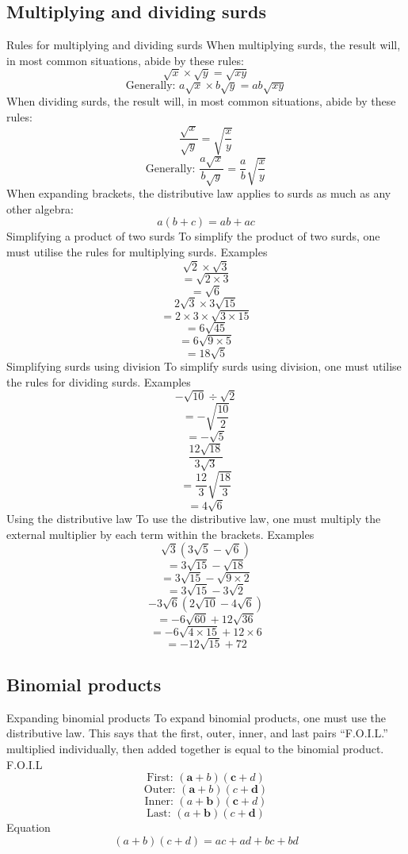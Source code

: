 \begin{outline}
\subsection{Multiplying and dividing surds}
	\1 Rules for multiplying and dividing surds
	 	\2 When multiplying surds, the result will, in most common situations, abide by these rules:
	 	 	\[\sqrt{x} \times \sqrt{y} = \sqrt{xy}\]
	 	 	\[\text{Generally: } a\sqrt{x} \times b\sqrt{y} = ab\sqrt{xy}\]
	 	\2 When dividing surds, the result will, in most common situations, abide by these rules:
	 	 	\[\frac{\sqrt{x}}{\sqrt{y}} = \sqrt{\frac{x}{y}}\]
	 	 	\[\text{Generally: } \frac{a\sqrt{x}}{b\sqrt{y}} = \frac{a}{b}\sqrt{\frac{x}{y}}\]
	 	\2 When expanding brackets, the distributive law applies to surds as much as any other algebra:
	 	 	\[a(b+c) = ab+ac\]
	\1 Simplifying a product of two surds
	 	\2 To simplify the product of two surds, one must utilise the rules for multiplying surds.
	 	 	\3 Examples
	 	 	 	\[\sqrt{2} \times \sqrt{3}\]
	 	 	 	\[= \sqrt{2 \times 3}\]
	 	 	 	\[= \sqrt{6}\]
	 	 	 	\[\]
	 	 	 	\[2\sqrt{3} \times 3\sqrt{15}\]
	 	 	 	\[= 2 \times 3 \times \sqrt{3 \times 15}\]
	 	 	 	\[= 6\sqrt{45}\]
	 	 	 	\[= 6\sqrt{9 \times 5}\]
	 	 	 	\[= 18\sqrt{5}\]
	\1 Simplifying surds using division
	 	\2 To simplify surds using division, one must utilise the rules for dividing surds.
	 	 	\3 Examples
	 	 	 	\[-\sqrt{10} \div \sqrt{2}\]
	 	 	 	\[= -\sqrt{\frac{10}{2}}\]
	 	 	 	\[= -\sqrt{5}\]
	 	 	 	\[\]
	 	 	 	\[\frac{12\sqrt{18}}{3\sqrt{3}}\]
	 	 	 	\[= \frac{12}{3}\sqrt{\frac{18}{3}}\]
	 	 	 	\[= 4\sqrt{6}\]
	\1 Using the distributive law
	 	\2 To use the distributive law, one must multiply the external multiplier by each term within the brackets.
	 		\3 Examples
	 			\[\sqrt{3}(3\sqrt{5}-\sqrt{6})\]
	 			\[= 3\sqrt{15}-\sqrt{18}\]
	 			\[= 3\sqrt{15}-\sqrt{9 \times 2}\]
	 			\[= 3\sqrt{15}-3\sqrt{2}\]
	 			\[\]
	 			\[-3\sqrt{6}(2\sqrt{10}-4\sqrt{6})\]
	 			\[= -6\sqrt{60}+12\sqrt{36}\]
	 			\[= -6\sqrt{4 \times 15}+12 \times 6\]
	 			\[= -12\sqrt{15}+72\]

\0
\subsection{Binomial products}
	\1 Expanding binomial products
		\2 To expand binomial products, one must use the distributive law. This says that the first, outer, inner, and last pairs ``F.O.I.L.'' multiplied individually, then added together is equal to the binomial product.
			\3 F.O.I.L
				\[\text{First: }(\textbf{a} + b)(\textbf{c} + d)\]
				\[\text{Outer: }(\textbf{a} + b)(c + \textbf{d})\]
				\[\text{Inner: }(a + \textbf{b})(\textbf{c} + d)\]
				\[\text{Last: }(a + \textbf{b})(c + \textbf{d})\]
			\3 Equation
				\[(a + b)(c + d) = ac + ad + bc + bd\]


\end{outline}
